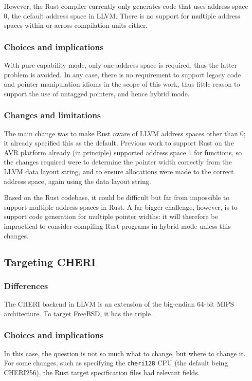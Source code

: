 \documentclass[dissertation.tex]{subfiles}
\begin{document}
However, the Rust compiler currently only generates code that uses
address space 0, the default address space in LLVM.
There is no support for multiple address spaces within or across
compilation units either.

\subsubsection{Choices and implications}
With pure capability mode, only one address space is required, thus the
latter problem is avoided.
In any case, there is no requirement to support legacy code and pointer
manipulation idioms in the scope of this work, thus little reason to
support the use of untagged pointers, and hence hybrid mode.

\subsubsection{Changes and limitations}
The main change was to make Rust aware of LLVM address spaces other than
0; it already specified this as the default.
Previous work to support Rust on the AVR platform already (in principle)
supported address space 1 for functions, so the changes required were to
determine the pointer width correctly from the LLVM data layout string,
and to ensure allocations were made to the correct address space, again
using the data layout string.

Based on the Rust codebase, it could be difficult but far from
impossible to support multiple address spaces in Rust.
A far bigger challenge, however, is to support code generation for
multiple pointer widths: it will therefore be impractical to consider
compiling Rust programs in hybrid mode unless this changes.


\subsection{Targeting CHERI}
\label{sec:impl-cheritarget}

\subsubsection{Differences}
The CHERI backend in LLVM is an extension of the big-endian 64-bit MIPS
architecture.
To target FreeBSD, it has the triple \cuf.

\subsubsection{Choices and implications}
In this case, the question is not so much what to change, but where to
change it.
For some changes, such as specifying the \texttt{cheri128} CPU (the
default being CHERI256), the Rust target specification files had
relevant fields.
\end{document}
